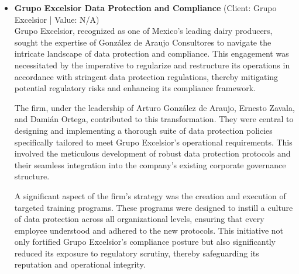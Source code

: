\documentclass[11pt]{article}
\begin{document}
\begin{itemize}
This matter demonstrates González de Araujo Consultores' commitment to providing strategic advisory services in data protection, particularly within the hospitality industry. By tailoring data protection strategies to meet the specific needs of Hotel Riazor, the firm not only reinforced the client's compliance capabilities but also demonstrated its leadership in navigating complex data protection challenges. This engagement supports the submission's overarching thesis of strategic advisory excellence, showcasing the firm's ability to deliver customized solutions that address the unique requirements of significant Mexican clients.
\item \textbf{Grupo Excelsior Data Protection and Compliance} (Client: Grupo Excelsior | Value: N/A)\\ Grupo Excelsior, recognized as one of Mexico's leading dairy producers, sought the expertise of González de Araujo Consultores to navigate the intricate landscape of data protection and compliance. This engagement was necessitated by the imperative to regularize and restructure its operations in accordance with stringent data protection regulations, thereby mitigating potential regulatory risks and enhancing its compliance framework.

The firm, under the leadership of Arturo González de Araujo, Ernesto Zavala, and Damián Ortega, contributed to this transformation. They were central to designing and implementing a thorough suite of data protection policies specifically tailored to meet Grupo Excelsior's operational requirements. This involved the meticulous development of robust data protection protocols and their seamless integration into the company's existing corporate governance structure.

A significant aspect of the firm's strategy was the creation and execution of targeted training programs. These programs were designed to instill a culture of data protection across all organizational levels, ensuring that every employee understood and adhered to the new protocols. This initiative not only fortified Grupo Excelsior's compliance posture but also significantly reduced its exposure to regulatory scrutiny, thereby safeguarding its reputation and operational integrity.


\end{itemize}
\end{document}
